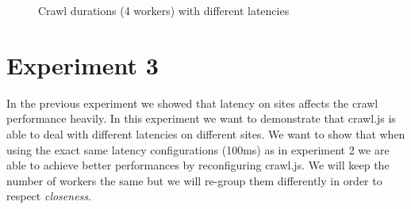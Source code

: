 \begin{figure}
\centering
\caption{Crawl durations (4 workers) with different latencies}
\label{plot:exp_002}
\end{figure}

\section{Experiment 3}

In the previous experiment we showed that latency on sites affects the crawl performance heavily. In this experiment we want to demonstrate that crawl.js is able to deal with different latencies on different sites. We want to show that when using the exact same latency configurations (100ms) as in experiment 2 we are able to achieve better performances by reconfiguring crawl.js. We will keep the number of workers the same but we will re-group them differently in order to respect \emph{closeness}.


